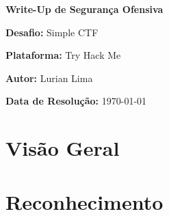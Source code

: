 \documentclass[12pt]{article} %
\begin{document}
\begin{titlepage}
    \centering
    \vspace*{2cm}
    {\Huge \textbf{Write-Up de Segurança Ofensiva} \par}
    \vspace{1.5cm}
    {\Large \textbf{Desafio:} Simple CTF \par}
    {\large \textbf{Plataforma:} Try Hack Me \par}
    {\large \textbf{Autor:} Lurian Lima \par}
    \vspace{2cm}
    {\large \textbf{Data de Resolução:} \today \par}
    \vfill
\end{titlepage}

\tableofcontents
\newpage



\section{Visão Geral}

\section{Reconhecimento}

\end{document}
